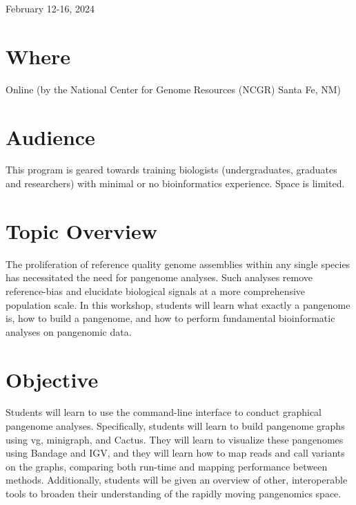 \documentclass[
]{book}
\begin{document}
February 12-16, 2024

\hypertarget{where}{%
\section*{Where}\label{where}}

Online (by the National Center for Genome Resources (NCGR) Santa Fe, NM)

\hypertarget{audience}{%
\section*{Audience}\label{audience}}

This program is geared towards training biologists (undergraduates, graduates and researchers) with minimal or no bioinformatics experience. Space is limited.

\hypertarget{topic-overview}{%
\section*{Topic Overview}\label{topic-overview}}

The proliferation of reference quality genome assemblies within any single species has necessitated the need for pangenome analyses. Such analyses remove reference-bias and elucidate biological signals at a more comprehensive population scale. In this workshop, students will learn what exactly a pangenome is, how to build a pangenome, and how to perform fundamental bioinformatic analyses on pangenomic data.

\hypertarget{objective}{%
\section*{Objective}\label{objective}}

Students will learn to use the command-line interface to conduct graphical pangenome analyses. Specifically, students will learn to build pangenome graphs using vg, minigraph, and Cactus. They will learn to visualize these pangenomes using Bandage and IGV, and they will learn how to map reads and call variants on the graphs, comparing both run-time and mapping performance between methods. Additionally, students will be given an overview of other, interoperable tools to broaden their understanding of the rapidly moving pangenomics space.
\end{document}
